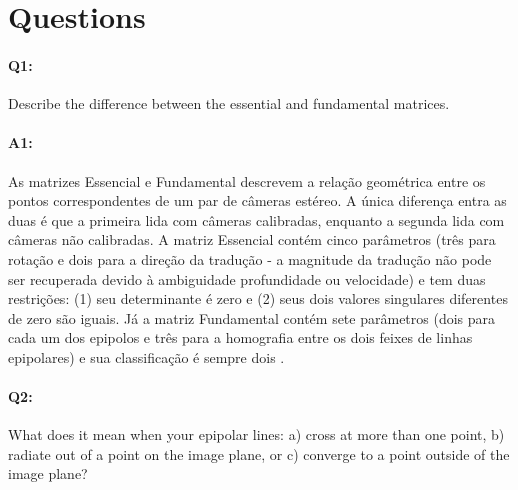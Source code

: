 
\section*{Questions}

\paragraph{Q1:} Describe the difference between the essential and fundamental matrices.

\paragraph{A1:} As matrizes Essencial e Fundamental descrevem a relação geométrica entre os pontos correspondentes de um par de câmeras estéreo. A única diferença entra as duas é que a primeira lida com câmeras calibradas, enquanto a segunda lida com câmeras não calibradas. A matriz Essencial contém cinco parâmetros (três para rotação e dois para a direção da tradução - a magnitude da tradução não pode ser recuperada devido à ambiguidade profundidade ou velocidade) e tem duas restrições: (1) seu determinante é zero e (2) seus dois valores singulares diferentes de zero são iguais. Já a matriz Fundamental contém sete parâmetros (dois para cada um dos epipolos e três para a homografia entre os dois feixes de linhas epipolares) e sua classificação é sempre dois \cite{Stanley}.



\pagebreak
\paragraph{Q2:} What does it mean when your epipolar lines: a) cross at more than one point, b) radiate out of a point on the image plane, or c) converge to a point outside of the image plane?

